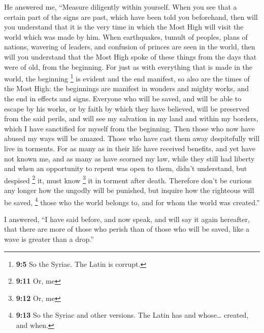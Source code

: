  He answered me, ``Measure diligently within yourself.
When you see that a certain part of the signs are past, which have been
told you beforehand,  then will you understand that it is
the very time in which the Most High will visit the world which was made
by him.  When earthquakes, tumult of peoples, plans of
nations, wavering of leaders, and confusion of princes are seen in the
world,  then will you understand that the Most High spoke
of these things from the days that were of old, from the beginning.
 For just as with everything that is made in the world,
the beginning \footnote{\textbf{9:5} So the Syriac. The Latin is
  corrupt.} is evident and the end manifest,  so also are
the times of the Most High: the beginnings are manifest in wonders and
mighty works, and the end in effects and signs.  Everyone
who will be saved, and will be able to escape by his works, or by faith
by which they have believed,  will be preserved from the
said perils, and will see my salvation in my land and within my borders,
which I have sanctified for myself from the beginning. 
Then those who now have abused my ways will be amazed. Those who have
cast them away despitefully will live in torments.  For
as many as in their life have received benefits, and yet have not known
me,  and as many as have scorned my law, while they still
had liberty and when an opportunity to repent was open to them, didn't
understand, but despised \footnote{\textbf{9:11} Or, me} it,
 must know \footnote{\textbf{9:12} Or, me} it in torment
after death.  Therefore don't be curious any longer how
the ungodly will be punished, but inquire how the righteous will be
saved, \footnote{\textbf{9:13} So the Syriac and other versions. The
  Latin has and whose\ldots{} created, and when.} those who the world
belongs to, and for whom the world was created.''

 I answered,  ``I have said before, and
now speak, and will say it again hereafter, that there are more of those
who perish than of those who will be saved,  like a wave
is greater than a drop.''

